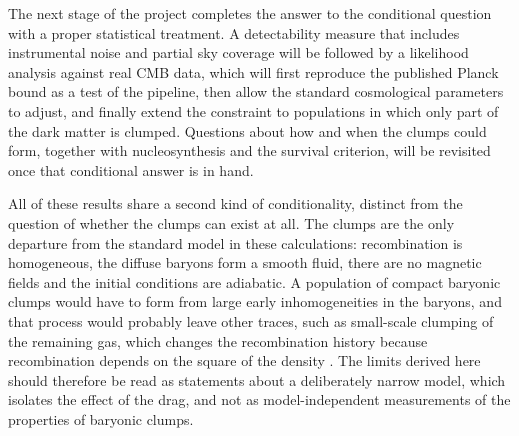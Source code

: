 \documentclass[11pt,a4paper]{article}
\begin{document}
The next stage of the project completes the answer to the conditional question with a proper statistical treatment. A detectability measure that includes instrumental noise and partial sky coverage will be followed by a likelihood analysis against real CMB data, which will first reproduce the published Planck bound as a test of the pipeline, then allow the standard cosmological parameters to adjust, and finally extend the constraint to populations in which only part of the dark matter is clumped. Questions about how and when the clumps could form, together with nucleosynthesis and the survival criterion, will be revisited once that conditional answer is in hand.

All of these results share a second kind of conditionality, distinct from the question of whether the clumps can exist at all. The clumps are the only departure from the standard model in these calculations: recombination is homogeneous, the diffuse baryons form a smooth fluid, there are no magnetic fields and the initial conditions are adiabatic. A population of compact baryonic clumps would have to form from large early inhomogeneities in the baryons, and that process would probably leave other traces, such as small-scale clumping of the remaining gas, which changes the recombination history because recombination depends on the square of the density \citep{JedamzikSaveliev2019}. The limits derived here should therefore be read as statements about a deliberately narrow model, which isolates the effect of the drag, and not as model-independent measurements of the properties of baryonic clumps.
\end{document}
